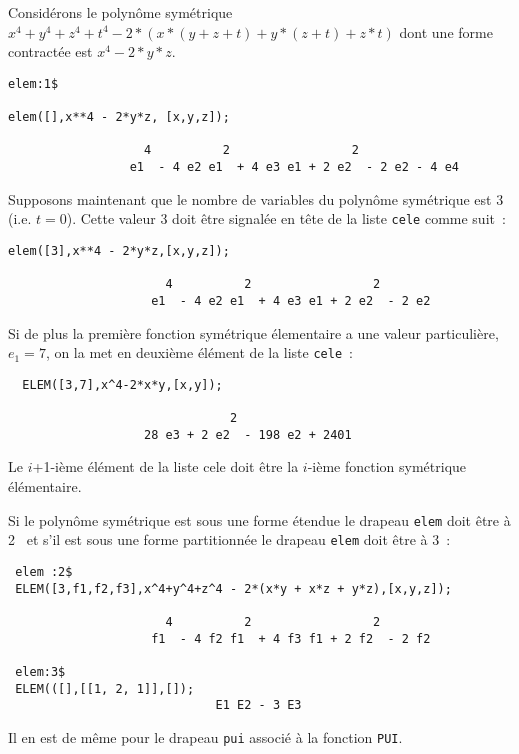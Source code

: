 \documentclass[11pt]{article}
\begin{document}
Consid\'erons le polyn\^ome sym\'etrique 
$x^4+y^4+z^4+t^4 - 2*(x*(y + z +t) + y*(z + t) + z*t)$
dont une forme contract\'ee est $x^4 -2*y*z$.
\small
\begin{verbatim}
elem:1$

elem([],x**4 - 2*y*z, [x,y,z]); 

                   4          2                 2
                 e1  - 4 e2 e1  + 4 e3 e1 + 2 e2  - 2 e2 - 4 e4
\end{verbatim}
\normalsize
Supposons maintenant que le nombre de variables du polyn\^ome
sym\'etrique est 3 (i.e. $t=0$). Cette valeur 3 doit \^etre signal\'ee
en t\^ete de la liste {\tt cele} comme suit~:
\small
\begin{verbatim}
elem([3],x**4 - 2*y*z,[x,y,z]);

                      4          2                 2
                    e1  - 4 e2 e1  + 4 e3 e1 + 2 e2  - 2 e2
\end{verbatim}
\normalsize
Si de plus la premi\`ere fonction sym\'etrique \'elementaire
a une valeur particuli\`ere, $e_1=7$, on la met en deuxi\`eme
\'el\'ement de la liste {\tt cele}~:
\small
\begin{verbatim}
  ELEM([3,7],x^4-2*x*y,[x,y]);

                               2
                   28 e3 + 2 e2  - 198 e2 + 2401
\end{verbatim}
\normalsize
Le $i$+1-i\`eme \'el\'ement de la liste cele doit \^etre la $i$-i\`eme
fonction sym\'etrique \'el\'ementaire.

Si le  polyn\^{o}me sym\'{e}trique est sous une forme \'etendue
le drapeau {\tt elem} doit \^{e}tre \`{a} 2~ et s'il est 
sous une forme partitionn\'ee le drapeau {\tt elem} doit \^{e}tre \`{a} 3~:\\

\small
\begin{verbatim}
 elem :2$
 ELEM([3,f1,f2,f3],x^4+y^4+z^4 - 2*(x*y + x*z + y*z),[x,y,z]);

                      4          2                 2
                    f1  - 4 f2 f1  + 4 f3 f1 + 2 f2  - 2 f2

 elem:3$
 ELEM(([],[[1, 2, 1]],[]);
                             E1 E2 - 3 E3
\end{verbatim}
\normalsize

Il en est de m\^{e}me pour le drapeau {\tt pui} associ\'e \`a la fonction
{\tt PUI}.\\
\end{document}
